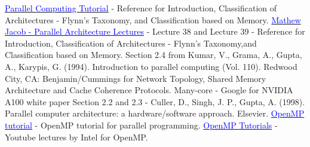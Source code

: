 \documentclass[12pt]{article}
\newcommand{\weblink}[2]{\href{#1}{\textcolor{blue}{#2}}}
\begin{document}
    









\newpage

\begin{thebibliography}{9}
    \weblink{http://www.llnl.gov/computing/tutorials/parallel_comp/}{Parallel Computing Tutorial} - Reference for Introduction, Classification of Architectures - Flynn's Taxonomy, and Classification based on Memory.
    \weblink{https://youtu.be/-yMWgtTeQgY?si=_PIhzFH7zZTydzcM}{Mathew Jacob - Parallel Architecture Lectures} - Lecture 38 and Lecture 39 - Reference for Introduction, Classification of Architectures - Flynn's Taxonomy,and Classification based on Memory.
    Section 2.4 from Kumar, V., Grama, A., Gupta, A., Karypis, G. (1994). Introduction to parallel computing (Vol. 110). Redwood City, CA: Benjamin/Cummings for Network Topology, Shared Memory Architecture and Cache Coherence Protocols.
    Many-core - Google for NVIDIA A100 white paper
    Section 2.2 and 2.3 - Culler, D., Singh, J. P., Gupta, A. (1998). Parallel computer architecture: a hardware/software approach. Elsevier.
    \weblink{https://hpc-tutorials.llnl.gov/openmp/}{OpenMP tutorial} - OpenMP tutorial for parallel programming.
    \weblink{https://www.youtube.com/watch?v=nE-xN4Bf8XI&list=PLLX-Q6B8xqZ8n8bwjGdzBJ25X2utwnoEG}{OpenMP Tutorials} - Youtube lectures by Intel for OpenMP.

\end{thebibliography}
\end{document}
